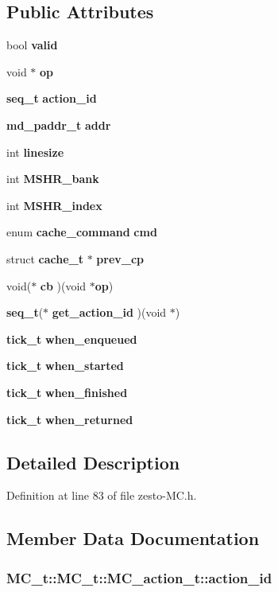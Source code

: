 \subsection*{Public Attributes}
\begin{CompactItemize}
\item 
bool {\bf valid}
\item 
void $\ast$ {\bf op}
\item 
{\bf seq\_\-t} {\bf action\_\-id}
\item 
{\bf md\_\-paddr\_\-t} {\bf addr}
\item 
int {\bf linesize}
\item 
int {\bf MSHR\_\-bank}
\item 
int {\bf MSHR\_\-index}
\item 
enum {\bf cache\_\-command} {\bf cmd}
\item 
struct {\bf cache\_\-t} $\ast$ {\bf prev\_\-cp}
\item 
void($\ast$ {\bf cb} )(void $\ast${\bf op})
\item 
{\bf seq\_\-t}($\ast$ {\bf get\_\-action\_\-id} )(void $\ast$)
\item 
{\bf tick\_\-t} {\bf when\_\-enqueued}
\item 
{\bf tick\_\-t} {\bf when\_\-started}
\item 
{\bf tick\_\-t} {\bf when\_\-finished}
\item 
{\bf tick\_\-t} {\bf when\_\-returned}
\end{CompactItemize}


\subsection{Detailed Description}


Definition at line 83 of file zesto-MC.h.

\subsection{Member Data Documentation}
\subsubsection[{action\_\-id}]{ MC\_\-t::MC\_\-t::MC\_\-action\_\-t::action\_\-id}\label{structMC__t_1_1MC__action__t_ea67a510ec141c5be82b9927102b701c}




